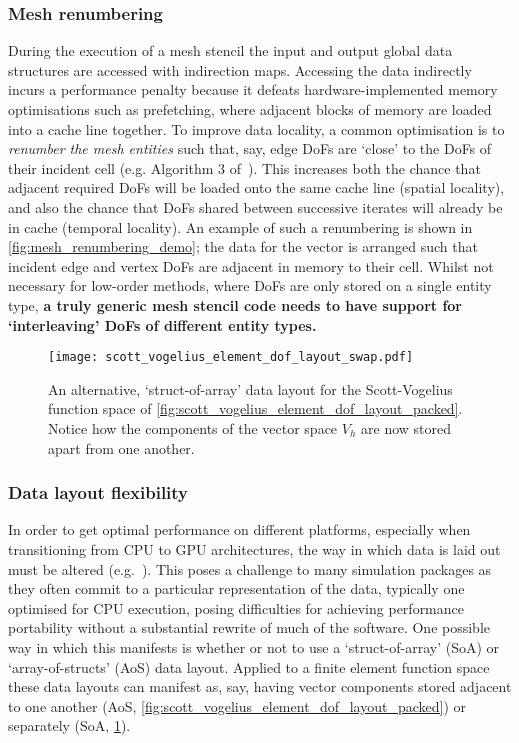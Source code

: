 \documentclass[thesis]{subfiles}
\begin{document}
\subsubsection{Mesh renumbering}

During the execution of a mesh stencil the input and output global data structures are accessed with indirection maps.
Accessing the data indirectly incurs a performance penalty because it defeats hardware-implemented memory optimisations such as prefetching, where adjacent blocks of memory are loaded into a cache line together.
To improve data locality, a common optimisation is to \textit{renumber the mesh entities} such that, say, edge DoFs are `close' to the DoFs of their incident cell (e.g. Algorithm 3 of~\cite{langeEfficientMeshManagement2016}).
This increases both the chance that adjacent required DoFs will be loaded onto the same cache line (spatial locality), and also the chance that DoFs shared between successive iterates will already be in cache (temporal locality).
An example of such a renumbering is shown in \cref{fig:mesh_renumbering_demo}; the data for the vector is arranged such that incident edge and vertex DoFs are adjacent in memory to their cell.
Whilst not necessary for low-order methods, where DoFs are only stored on a single entity type, \textbf{a truly generic mesh stencil code needs to have support for `interleaving' DoFs of different entity types.}

\begin{figure}
  \centering
  \texttt{[image: scott\_vogelius\_element\_dof\_layout\_swap.pdf]}
  \caption{
    An alternative, `struct-of-array' data layout for the Scott-Vogelius function space of \cref{fig:scott_vogelius_element_dof_layout_packed}.
    Notice how the components of the vector space $V_h$ are now stored apart from one another.
  }
  \label{fig:scott_vogelius_element_dof_layout_swap}
\end{figure}

\subsubsection{Data layout flexibility}

In order to get optimal performance on different platforms, especially when transitioning from CPU to GPU architectures, the way in which data is laid out must be altered (e.g.~\cite{markallFiniteElementAssembly2013,sulyokImprovingLocalityUnstructured2018}).
This poses a challenge to many simulation packages as they often commit to a particular representation of the data, typically one optimised for CPU execution, posing difficulties for achieving performance portability without a substantial rewrite of much of the software.
One possible way in which this manifests is whether or not to use a `struct-of-array' (SoA) or `array-of-structs' (AoS) data layout.
Applied to a finite element function space these data layouts can manifest as, say, having vector components stored adjacent to one another (AoS, \cref{fig:scott_vogelius_element_dof_layout_packed}) or separately (SoA, \cref{fig:scott_vogelius_element_dof_layout_swap}).
\end{document}
